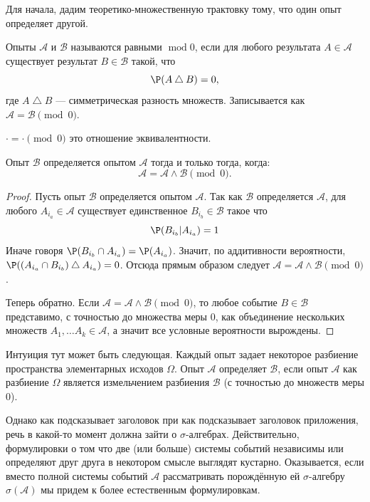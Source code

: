 Для начала, дадим теоретико-множественную трактовку тому, что один опыт определяет другой.
\begin{definition*}
	Опыты \(\mathcal{A}\) и \(\mathcal{B}\) называются равными \(\operatorname{mod} 0\), если для любого результата \(A\in\mathcal{A}\) существует результат \(B\in\mathcal{B}\) такой, что
    \[
		\P(A \mathbin{\triangle} B) = 0,
    \]
	где \(A \mathbin{\triangle} B\) --- симметрическая разность множеств. Записывается как \(\mathcal{A}= \mathcal{B}\pmod 0\).
\end{definition*}
\begin{remark}
	$\cdot = \cdot\pmod0$ это отношение эквивалентности.
\end{remark}
\begin{proposition*}
    Опыт \(\mathcal{B}\) определяется опытом \(\mathcal{A}\) тогда и только тогда, когда:
    \[
        \mathcal{A} = \mathcal{A}\land\mathcal{B}\pmod 0 .
    \]
\end{proposition*}
\begin{proof}
	Пусть опыт \(\mathcal{B}\) определяется опытом \(\mathcal{A}\). Так как $\mathcal{B}$ определяется $\mathcal{A}$, для любого $A_{i_a} \in \mathcal{A}$ существует единственное $B_{i_b} \in \mathcal{B}$ такое что 
	\[
		\P(B_{i_b} | A_{i_a}) = 1
	\]
	Иначе говоря $\P(B_{i_b} \cap A_{i_a}) = \P(A_{i_a})$. Значит, по аддитивности вероятности, $\P((A_{i_a} \cap B_{i_b}) \mathbin{\triangle} A_{i_a}) = 0$. Отсюда прямым образом следует $\mathcal{A} = \mathcal{A}\land\mathcal{B}\pmod 0$.  

	Теперь обратно. Если $\mathcal{A} = \mathcal{A}\land\mathcal{B} \pmod 0$, то любое событие $B \in \mathcal{B}$ представимо, с точностью до множества меры 0, как объединение нескольких множеств $A_1, \ldots A_k \in \mathcal{A}$, а значит все условные вероятности вырождены.
\end{proof}

\begin{remark}
	Интуиция тут может быть следующая. Каждый опыт задает некоторое разбиение пространства элементарных исходов $\Omega$. Опыт $\mathcal{A}$ определяет $\mathcal{B}$, если опыт $\mathcal{A}$ как разбиение $\Omega$ является измельчением разбиения $\mathcal{B}$ (с точностью до множеств меры 0).
\end{remark}

Однако как подсказывает заголовок при как подсказывает заголовок приложения, речь в какой-то момент должна зайти о $\sigma$-алгебрах. Действительно, формулировки о том что две (или больше) системы событий независимы или определяют друг друга в некотором смысле выглядят кустарно. Оказывается, если вместо полной системы событий $\mathcal{A}$ рассматривать порождённую ей $\sigma$-алгебру $\sigma(\mathcal{A})$ мы придем к более естественным формулировкам.

